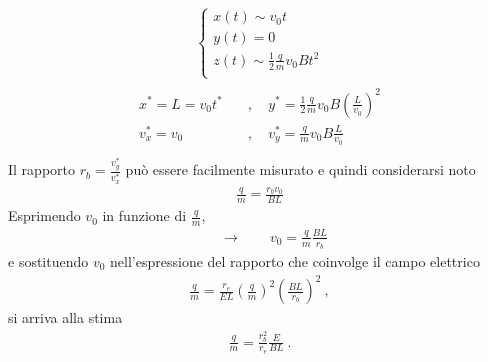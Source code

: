 \documentclass[letterpaper,10pt,italian]{jupyterBook}
\begin{document}
\begin{itemize}
\begin{equation*}
\begin{split}
\begin{cases}
    x(t) \sim v_0 t  \\
    y(t) = 0 \\
    z(t) \sim \frac{1}{2} \frac{q}{m} v_0 B t^2 \\
  \end{cases}\end{split}
\end{equation*}\begin{equation*}
\begin{split}\begin{aligned} 
       x^* = L = v_0 t^* \quad & , \quad   y^* = \frac{1}{2} \frac{q}{m} v_0 B \left( \frac{L}{v_0} \right)^2 \\
     v_x^* = v_0         \quad & , \quad v_y^* =             \frac{q}{m} v_0 B \frac{L}{v_0} \\
   \end{aligned}\end{split}
\end{equation*}
\sphinxAtStartPar
Il rapporto \(r_b = \frac{v_y^*}{v_x^*}\) può essere facilmente misurato e quindi considerarsi noto
\begin{equation*}
\begin{split}\frac{q}{m} = \frac{r_b v_0}{B L} \end{split}
\end{equation*}
\sphinxAtStartPar
{} Esprimendo \(v_0\) in funzione di \(\frac{q}{m}\),
\begin{equation*}
\begin{split} \qquad \rightarrow \qquad v_0 = \frac{q}{m} \frac{BL}{r_b}\end{split}
\end{equation*}
\sphinxAtStartPar
e sostituendo \(v_0\) nell’espressione del rapporto che coinvolge il campo elettrico
\begin{equation*}
\begin{split}\frac{q}{m} = \frac{r_e}{EL} \left(\frac{q}{m}\right)^2 \left( \frac{B L}{r_b} \right)^2 \ ,\end{split}
\end{equation*}
\sphinxAtStartPar
si arriva alla stima
\begin{equation*}
\begin{split}\frac{q}{m} = \frac{r_b^2}{r_e} \frac{E}{BL} \ .\end{split}
\end{equation*}
\end{itemize}
\end{document}
